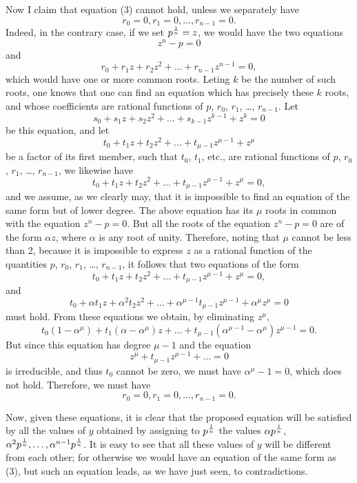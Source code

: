 \documentclass[oneside, 12 pt, leqno]{memoir}
\let\oldfrac\frac
\def\frac#1#2{\mathchoice{\text{\scalebox{.83}{${\oldfrac{#1}{#2}}$}}}{\text{\scalebox{.83}{${\displaystyle\oldfrac{#1}{#2}}$}}}{\genfrac{}{}{}{2}{#1}{#2}}{\genfrac{}{}{}{3}{#1}{#2}}}
\begin{document}
Now I claim that equation (3) cannot hold, unless we separately have
\[r_0=0, r_1=0, \dots, r_{n-1}=0.\]
Indeed, in the contrary case, if we set \(p^{\frac{1}{n}}=z\), we would have the two equations
\[z^n-p=0\]
and
\[r_0+r_1 z+r_2 z^2+\dots+r_{n-1} z^{n-1}=0,\]
which would have one or more common roots. Leting \(k\) be the number of such roots, one knows that one can find an equation which has precisely these \(k\) roots, and whose coefficients are rational functions of \(p\), \(r_0\), \(r_1\), \dots, \(r_{n-1}\). Let
\[s_0+s_1 z+s_2 z^2+\dots+s_{k-1} z^{k-1}+z^k=0\]
be this equation, and let
\[t_0+t_1 z+t_2 z^2+\dots+t_{\mu-1} z^{\mu-1}+z^\mu\]
be a factor of its first member, such that \(t_0\), \(t_1\), etc., are rational functions of \(p\), \(r_0\), \(r_1\), \dots, \(r_{n-1}\), we likewise have
\[t_0+t_1 z+t_2 z^2+\dots+t_{\mu-1} z^{\mu-1}+z^\mu=0,\]
and we assume, as we clearly may, that it is impossible to find an equation of the same form but of lower degree.  The above equation has its \(\mu\) roots in common with the equation \(z^n-p=0\).  But all the roots of the equation \(z^n-p=0\) are of the form \(\alpha z\), where \(\alpha\) is any root of unity. Therefore, noting that \(\mu\) cannot be less than 2, because it is impossible to express \(z\) as a rational function of the quantities \(p\), \(r_0\), \(r_1\), \dots, \(r_{n-1}\), it follows that two equations of the form
\[t_0+t_1 z+t_2 z^2+\dots+t_{\mu-1} z^{\mu-1}+z^\mu=0,\]
and
\[t_0+\alpha t_1 z+\alpha^2 t_2 z^2+\dots+\alpha^{\mu-1} t_{\mu-1} z^{\mu-1}+\alpha^\mu z^\mu=0\]
must hold. From these equations we obtain, by eliminating \(z^\mu\), 
\[t_0\left(1-\alpha^\mu\right)+t_1\left(\alpha-\alpha^\mu\right) z+\dots+t_{\mu-1}\left(\alpha^{\mu-1}-\alpha^\mu\right) z^{\mu-1}=0.\]
But since this equation has degree \(\mu-1\) and the equation
\[z^\mu+t_{\mu-1} z^{\mu-1}+\dots=0\]
is irreducible, and thus \(t_0\) cannot be zero, we must have \(\alpha^\mu-1=0\), which does not hold. Therefore, we must have
\[r_0=0, r_1=0, \dots, r_{n-1}=0.\]

Now, given these equations, it is clear that the proposed equation will be satisfied by all the values of \(y\) obtained by assigning to \(p^{\frac{1}{n}}\) the values \(\alpha p^{\frac{1}{n}}\), \(\alpha^2 p^{\frac{1}{n}}, \dots, \alpha^{n-1} p^{\frac{1}{n}}\). It is easy to see that all these values of \(y\) will be different from each other; for otherwise we would have an equation of the same form as (3), but such an equation leads, as we have just seen, to contradictions.
\end{document}
